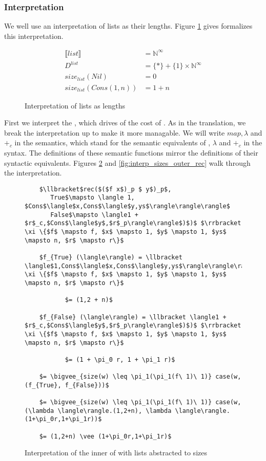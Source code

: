 \subsubsection{Interpretation}
We well use an interpretation of lists as their lengths.
Figure \ref{fig:interp_sizes} gives formalizes this interpretation.
\begin{figure}[H]
  \caption{Interpretation of lists as lengths}
  \label{fig:interp_sizes}
  \begin{align*}
    \llbracket list \rrbracket &= \mathbb{N}^\infty \\
    D^{list} &= \{\ast\} + \{1\} \times \mathbb{N}^\infty \\
    size_{list} (Nil) &= 0 \\
    size_{list} (Cons(1,n)) &= 1 + n
  \end{align*}
\end{figure}

First we interpret the , which drives of the cost of .
As in the translation, we break the interpretation up to make it more managable.
We will write $map, \lambda$ and $+_c$ in the semantics, which stand for the semantic equivalents of , $\lambda$ and $+_c$ in the syntax.
The definitions of these semantic functions mirror the definitions of their syntactic equivalents.
Figures \ref{fig:interp_sizes_inner_rec} and \ref{fig:interp_sizes_outer_rec} walk through the interpretation.

\begin{figure}[H]
  \caption{Interpretation of the inner  of  with lists abstracted to sizes}
  \label{fig:interp_sizes_inner_rec}
  \begin{lstlisting}
    $\llbracket$rec($($f x$)_p $ y$)_p$,
       True$\mapsto \langle 1, $Cons$\langle$x,Cons$\langle$y,ys$\rangle\rangle\rangle$
       False$\mapsto \langle1 + $r$_c,$Cons$\langle$y$,$r$_p\rangle\rangle$)$)$ $\rrbracket \xi \{$f$ \mapsto f, $x$ \mapsto 1, $y$ \mapsto 1, $ys$ \mapsto n, $r$ \mapsto r\}$

    $f_{True} (\langle\rangle) = \llbracket \langle$1,Cons$\langle$x,Cons$\langle$y,ys$\rangle\rangle\rangle\rrbracket \xi \{$f$ \mapsto f, $x$ \mapsto 1, $y$ \mapsto 1, $ys$ \mapsto n, $r$ \mapsto r\}$

           $= (1,2 + n)$

    $f_{False} (\langle\rangle) = \llbracket \langle1 + $r$_c,$Cons$\langle$y$,$r$_p\rangle\rangle$)$)$ $\rrbracket \xi \{$f$ \mapsto f, $x$ \mapsto 1, $y$ \mapsto 1, $ys$ \mapsto n, $r$ \mapsto r\}$

           $= (1 + \pi_0 r, 1 + \pi_1 r)$
    
    $= \bigvee_{size(w) \leq \pi_1(\pi_1(f\ 1)\ 1)} case(w, (f_{True}, f_{False}))$

    $= \bigvee_{size(w) \leq \pi_1(\pi_1(f\ 1)\ 1)} case(w, (\lambda \langle\rangle.(1,2+n), \lambda \langle\rangle.(1+\pi_0r,1+\pi_1r))$

    $= (1,2+n) \vee (1+\pi_0r,1+\pi_1r)$
  \end{lstlisting}
\end{figure}

